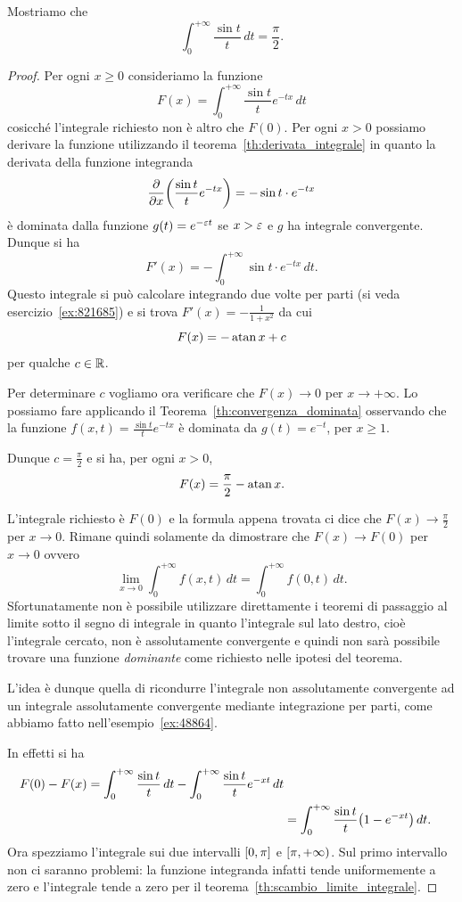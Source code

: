 \begin{exercise}
  \label{ex:integrale_sin_integrale}%
Mostriamo che 
  \[
    \int_0^{+\infty} \frac{\sin t}{t}\, dt = \frac \pi 2.
  \] 
\end{exercise}
\begin{proof}
Per ogni $x \ge 0$ consideriamo la funzione 
\[
  F(x) = \int_0^{+\infty} \frac{\sin t}{t}e^{-tx}\, dt
\]
cosicché l'integrale richiesto non è altro che $F(0)$.
Per ogni $x>0$
possiamo derivare la funzione utilizzando il teorema~\ref{th:derivata_integrale}
in quanto la derivata della funzione integranda 
\[
  \frac{\partial}{\partial x}{\left( \frac{\sin t}{t}e^{-tx} \right)} 
  = -\sin t \cdot e^{-tx}
\]
è dominata dalla funzione $g(t) = e^{- \varepsilon t}$ se $x>\varepsilon$ e 
$g$ ha integrale convergente.
Dunque si ha 
\[
  F'(x) = - \int_0^{+\infty} \sin t \cdot e^{-tx}\, dt. 
\]
Questo integrale si può calcolare integrando due volte per parti 
(si veda esercizio~\ref{ex:821685}) e si trova 
$F'(x) = -\frac{1}{1+x^2}$ da cui
\[
  F(x) = -\operatorname{atan} x + c
\]
per qualche $c \in {\mathbb R}$.

Per determinare $c$ 
vogliamo ora verificare che $F(x) \to 0$ per $x\to +\infty$.
Lo possiamo fare applicando il Teorema~\ref{th:convergenza_dominata} osservando che 
la funzione $f(x,t) = \frac{\sin t}{t}e^{-tx}$ è dominata da $g(t) = e^{-t}$, per $x\ge 1$.

Dunque $c=\frac{\pi} 2$ e si ha, per ogni $x>0$,
\[
  F(x) = \frac{\pi} 2 - \operatorname{atan} x.
\]

L'integrale richiesto è $F(0)$ e la formula appena trovata ci 
dice che $F(x)\to \frac \pi 2$ per $x\to 0$. 
Rimane quindi solamente da dimostrare che $F(x)\to F(0)$ per 
$x\to 0$ ovvero 
\[
  \lim_{x\to 0} \int_0^{+\infty} f(x,t) \, dt
  = \int_0^{+\infty} f(0,t) \, dt.
\]
Sfortunatamente non è possibile utilizzare direttamente i teoremi 
di passaggio al limite sotto il segno di integrale in quanto 
l'integrale sul lato destro, cioè l'integrale cercato, non 
è assolutamente convergente e quindi non sarà possibile trovare 
una funzione \emph{dominante} come richiesto nelle ipotesi del teorema.

L'idea è dunque quella di ricondurre l'integrale non assolutamente convergente 
ad un integrale assolutamente convergente mediante integrazione per parti, 
come abbiamo fatto nell'esempio~\ref{ex:48864}.

In effetti si ha 
\begin{align*}
F(0) - F(x) 
 = \int_0^{+\infty} \frac{\sin t}{t}\, dt  - \int_0^{+\infty} \frac{\sin t}{t}e^{-xt}\, dt \\
 & = \int_0^{+\infty} \frac{\sin t}{t}{\left( 1-e^{-xt} \right)}\, dt.
\end{align*}
Ora spezziamo l'integrale sui due intervalli $\left[0,\pi\right]$ 
e $\left[\pi,+\infty\right)$.
Sul primo intervallo non ci saranno problemi: la funzione integranda 
infatti tende uniformemente a zero e l'integrale tende a zero 
per il teorema~\ref{th:scambio_limite_integrale}.


\end{proof}
